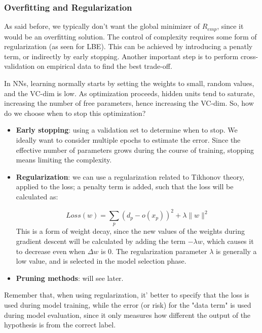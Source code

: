 \subsubsection{Overfitting and Regularization}

As said before, we typically don't want the global minimizer of $R_{emp}$, since it would be an overfitting solution. The control of complexity requires some form of regularization (as seen for LBE). This can be achieved by introducing a penatly term, or indirectly by early stopping. Another important step is to perform cross-validation on empirical data to find the best trade-off.

In NNs, learning normally starts by setting the weights to small, random values, and the VC-dim is low. As optimization proceeds, hidden units tend to saturate, increasing the number of free parameters, hence increasing the VC-dim. So, how do we choose when to stop this optimization?

\begin{itemize}
    \item \textbf{Early stopping}: using a validation set to determine when to stop. We ideally want to consider multiple epochs to estimate the error. Since the effective number of parameters grows during the course of training, stopping means limiting the complexity.

    \item \textbf{Regularization}: we can use a regularization related to Tikhonov theory, applied to the loss; a penalty term is added, such that the loss will be calculated as:

    \begin{equation*}
        Loss(w) = \sum_p (d_p - o(x_p))^2 + \lambda\|w\|^2
    \end{equation*}
    This is a form of weight decay, since the new values of the weights during gradient descent will be calculated by adding the term $- \lambda w$, which causes it to decrease even when $\Delta w$ is 0. The regularization parameter $\lambda$ is generally a low value, and is selected in the model selection phase.

    \item \textbf{Pruning methods}: will see later.
\end{itemize}

Remember that, when using regularization, it' better to specify that the loss is used during model training, while the error (or risk) for the "data term" is used during model evaluation, since it only measures how different the output of the hypothesis is from the correct label.

